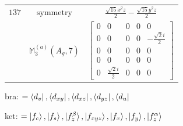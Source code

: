 \documentclass[fleqn,8pt,landscape]{jsarticle}
\begin{document}
\begin{longtable}{ccc}
$ 137 $ & $ \text{symmetry} $ & $ \frac{\sqrt{15} x^{2} z}{2} - \frac{\sqrt{15} y^{2} z}{2} $ \\
$  $ & $ \mathbb{M}_{3}^{(a)}(A_{g},7) $ & $ \begin{bmatrix} 0 & 0 & 0 & 0 & 0 \\ 0 & 0 & 0 & 0 & - \frac{\sqrt{2} i}{2} \\ 0 & 0 & 0 & 0 & 0 \\ 0 & 0 & 0 & 0 & 0 \\ 0 & \frac{\sqrt{2} i}{2} & 0 & 0 & 0 \end{bmatrix} $ \\ \hline
\end{longtable}
bra: $=\bra{d_{v}}, \bra{d_{xy}}, \bra{d_{xz}}, \bra{d_{yz}}, \bra{d_{u}}$

\noindent
ket: $=\ket{f_{c}}, \ket{f_{s}}, \ket{f_{z}^{\beta}}, \ket{f_{xyz}}, \ket{f_{x}}, \ket{f_{y}}, \ket{f_{z}^{\alpha}}$
\renewcommand{\arraystretch}{1.6}
\end{document}
